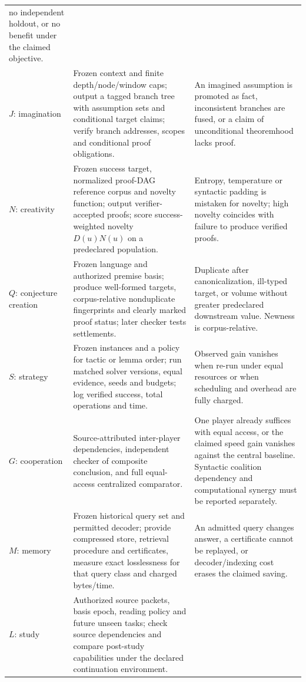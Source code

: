 \documentclass[11pt,letterpaper]{article}
\theoremstyle{definition}
\theoremstyle{plain}
\theoremstyle{definition}
\begin{document}
\begin{longtable}{@{}p{.13\linewidth}p{.40\linewidth}p{.40\linewidth}@{}}
no independent holdout, or no benefit under the claimed objective.\\[3pt]
$J$: imagination & Frozen context and finite depth/node/window caps; output a tagged branch tree with assumption sets and conditional target claims; verify branch addresses, scopes and conditional proof obligations. & An imagined assumption is promoted as fact, inconsistent branches are fused, or a claim of unconditional theoremhood lacks proof.\\[3pt]
$N$: creativity & Frozen success target, normalized proof-DAG reference corpus and novelty function; output verifier-accepted proofs; score success-weighted novelty $D(u)N(u)$ on a predeclared population. & Entropy, temperature or syntactic padding is mistaken for novelty; high novelty coincides with failure to produce verified proofs.\\[3pt]
$Q$: conjecture creation & Frozen language and authorized premise basis;
produce well-formed targets, corpus-relative nonduplicate fingerprints
and clearly marked proof status; later checker tests settlements. &
Duplicate after canonicalization, ill-typed target, or volume without
greater predeclared downstream value. Newness is corpus-relative.\\[3pt]
$S$: strategy & Frozen instances and a policy for tactic or lemma order;
run matched solver versions, equal evidence, seeds and budgets; log
verified success, total operations and time. &
Observed gain vanishes when re-run under equal resources or when
scheduling and overhead are fully charged.\\[3pt]
$G$: cooperation & Source-attributed inter-player dependencies,
independent checker of composite conclusion, and full equal-access
centralized comparator. &
One player already suffices with equal access, or the claimed speed gain
vanishes against the central baseline. Syntactic coalition dependency
and computational synergy must be reported separately.\\[3pt]
$M$: memory & Frozen historical query set and permitted decoder;
provide compressed store, retrieval procedure and certificates,
measure exact losslessness for that query class and charged bytes/time. &
An admitted query changes answer, a certificate cannot be replayed,
or decoder/indexing cost erases the claimed saving.\\[3pt]
$L$: study & Authorized source packets, basis epoch, reading policy and
future unseen tasks; check source dependencies and compare post-study
capabilities under the declared continuation environment. &

\end{longtable}
\end{document}
